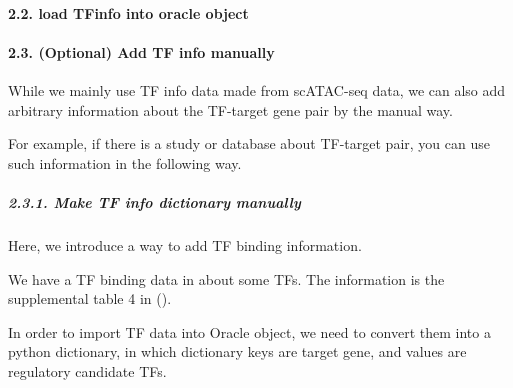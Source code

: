 \documentclass[letterpaper,10pt,english]{sphinxmanual}
\begin{document}
\paragraph{2.2. load TFinfo into oracle object}
\label{\detokenize{notebooks/04_Network_analysis/Network_analysis_with_with_Paul_etal_2015_data:2.2.-load-TFinfo-into-oracle-object}}
{
%
\begin{sphinxVerbatim}[commandchars=\\\{\}]
\llap{\color{nbsphinxin}[15]:\,\hspace{\fboxrule}\hspace{\fboxsep}}

\end{sphinxVerbatim}
}


\paragraph{2.3. (Optional) Add TF info manually}
\label{\detokenize{notebooks/04_Network_analysis/Network_analysis_with_with_Paul_etal_2015_data:2.3.-(Optional)-Add-TF-info-manually}}
While we mainly use TF info data made from scATAC-seq data, we can also add arbitrary information about the TF-target gene pair by the manual way.

For example, if there is a study or database about TF-target pair, you can use such information in the following way.


\subparagraph{2.3.1. Make TF info dictionary manually}
\label{\detokenize{notebooks/04_Network_analysis/Network_analysis_with_with_Paul_etal_2015_data:2.3.1.-Make-TF-info-dictionary-manually}}
Here, we introduce a way to add TF binding information.

We have a TF binding data in about some TFs. The information is the supplemental table 4 in ().

In order to import TF data into Oracle object, we need to convert them into a python dictionary, in which dictionary keys are target gene, and values are regulatory candidate TFs.
\end{document}
